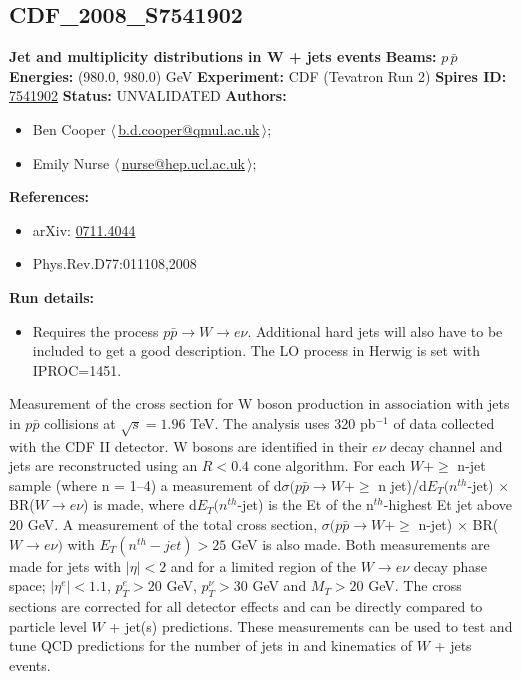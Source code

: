 \subsection[CDF\_2008\_S7541902]{CDF\_2008\_S7541902\,\cite{Aaltonen:2007ip}}
\textbf{Jet \pT and multiplicity distributions in W + jets events}\newline
\textbf{Beams:} $p$\,$\bar{p}$ \newline
\textbf{Energies:} (980.0, 980.0) GeV \newline
\textbf{Experiment:} CDF (Tevatron Run 2) \newline
\textbf{Spires ID:} \href{http://www.slac.stanford.edu/spires/find/hep/www?rawcmd=key+7541902}{7541902}\newline
\textbf{Status:} UNVALIDATED\newline
\textbf{Authors:}
\begin{itemize}
  \item Ben Cooper $\langle\,$\href{mailto:b.d.cooper@qmul.ac.uk}{b.d.cooper@qmul.ac.uk}$\,\rangle$;
  \item Emily Nurse $\langle\,$\href{mailto:nurse@hep.ucl.ac.uk}{nurse@hep.ucl.ac.uk}$\,\rangle$;
\end{itemize}
\textbf{References:}
\begin{itemize}
  \item arXiv: \href{http://arxiv.org/abs/0711.4044}{0711.4044}
  \item Phys.Rev.D77:011108,2008
\end{itemize}
\textbf{Run details:}
\begin{itemize}

  \item Requires the process $p\bar{p} \rightarrow {W} \rightarrow {e}\nu$. Additional hard jets will also have to be included to get a good description. The LO process in Herwig is set with IPROC=1451.\end{itemize}

\noindent Measurement of the cross section for W boson production in association with jets in $p\bar{p}$ collisions at $\sqrt{s}=1.96$ TeV. The analysis uses 320 pb$^{-1}$ of data collected with the CDF II detector. W bosons are identified in their $e\nu$ decay channel and jets are reconstructed using an $R < 0.4$ cone algorithm. For each $W + \geq$ n-jet sample (where n = 1--4) a measurement of d$\sigma({p}\bar{p} \rightarrow W + \geq$ n jet)/d$E_T(n^{th}$-jet) $\times$ BR($W \rightarrow{e}\nu$) is made, where d$E_T(n^{th}$-jet) is the Et of the n$^{th}$-highest Et jet above 20 GeV. A measurement of the total cross section, $\sigma(p\bar{p} \rightarrow W + \geq$ n-jet) $\times$ BR($W \rightarrow{e}\nu)$ with $E_T(n^{th}-jet) > 25$ GeV is also made. Both measurements are made for jets with $|\eta| < 2$ and for a limited region of the $W \rightarrow{e}\nu$ decay phase space; $|\eta^{e}| < 1.1$, $p_{T}^{e} > 20$ GeV, $p_{T}^{\nu} > 30$ GeV and $M_{T} > 20$ GeV. The cross sections are corrected for all detector effects and can be directly compared to particle level $W$ + jet(s) predictions. These measurements can be used to test and tune QCD predictions for the number of jets in and kinematics of $W$ + jets events.

